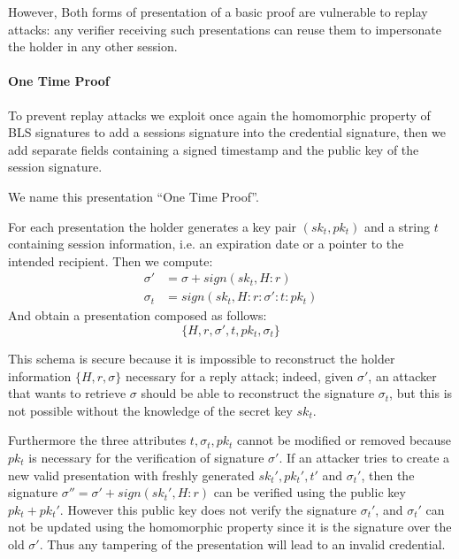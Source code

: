 However, Both forms of presentation of a basic proof are vulnerable to
replay attacks: any verifier receiving such presentations can reuse
them to impersonate the holder in any other session.

\paragraph{One Time Proof}

To prevent replay attacks we exploit once again the homomorphic
property of BLS signatures to add a sessions signature into the
credential signature, then we add separate fields containing a signed
timestamp and the public key of the session signature.

We name this presentation ``One Time Proof''.

For each presentation the holder generates a key pair $(sk_t, pk_t)$
and a string $t$ containing session information, i.e. an expiration
date or a pointer to the intended recipient. Then we compute:
\begin{equation*}
    \begin{split}
        \sigma' &= \sigma + sign(sk_t, H : r) \\
        \sigma_{t} &= sign(sk_t, H : r : \sigma' : t : pk_t)
    \end{split}
\end{equation*}
And obtain a presentation composed as follows:
\begin{equation*}
    \{H, r, \sigma', t, pk_t,  \sigma_t\}
\end{equation*}

This schema is secure because it is impossible to reconstruct the
holder information $\{H,r,\sigma\}$ necessary for a reply attack;
indeed, given $\sigma'$, an attacker that wants to retrieve $\sigma$
should be able to reconstruct the signature $\sigma_t$,
but this is not possible without the knowledge of the secret key $sk_t$.

Furthermore the three attributes $t,\sigma_t, pk_t$ cannot be modified
or removed because $pk_t$ is necessary for the verification of
signature $\sigma'$.  If an attacker tries to create a new valid
presentation with freshly generated $sk_t', pk_t', t'$ and
$\sigma_t'$, then the signature $\sigma'' = \sigma' + sign(sk_t',
H:r)$ can be verified using the public key $pk_t + pk_t'$.  However
this public key does not verify the signature $\sigma_t'$, and
$\sigma_t'$ can not be updated using the homomorphic property since it
is the signature over the old $\sigma'$.  Thus any tampering of the
presentation will lead to an invalid credential.

